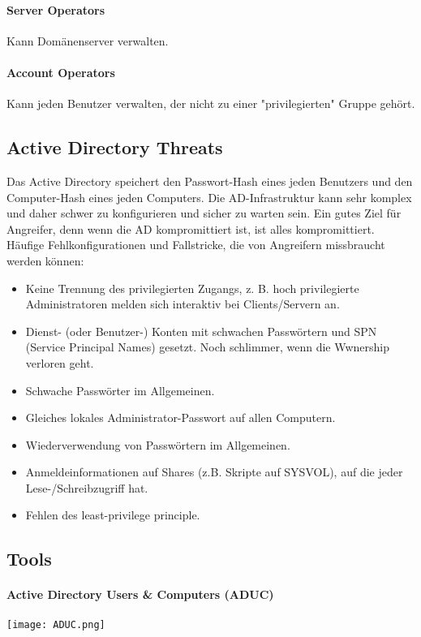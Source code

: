 \paragraph{Server Operators}
Kann Domänenserver verwalten.
\paragraph{Account Operators}
Kann jeden Benutzer verwalten, der nicht zu einer "privilegierten" Gruppe gehört.

\subsection{Active Directory Threats}
Das Active Directory speichert den Passwort-Hash eines jeden Benutzers und den Computer-Hash eines jeden Computers. 
Die AD-Infrastruktur kann sehr komplex und daher schwer zu konfigurieren und sicher zu warten sein.
Ein gutes Ziel für Angreifer, denn wenn die AD kompromittiert ist, ist alles kompromittiert.\\

Häufige Fehlkonfigurationen und Fallstricke, die von Angreifern missbraucht werden können:
\begin{itemize}
  \item Keine Trennung des privilegierten Zugangs, z. B. hoch privilegierte Administratoren melden sich interaktiv bei Clients/Servern an.
  \item Dienst- (oder Benutzer-) Konten mit schwachen Passwörtern und SPN (Service Principal Names) gesetzt. Noch schlimmer, wenn die Wwnership verloren geht.
  \item Schwache Passwörter im Allgemeinen.
  \item Gleiches lokales Administrator-Passwort auf allen Computern.
  \item Wiederverwendung von Passwörtern im Allgemeinen.
  \item Anmeldeinformationen auf Shares (z.B. Skripte auf SYSVOL), auf die jeder Lese-/Schreibzugriff hat.
  \item Fehlen des least-privilege principle.
\end{itemize}

\subsection{Tools}
\paragraph{Active Directory Users \& Computers (ADUC)}
\texttt{[image: ADUC.png]}

